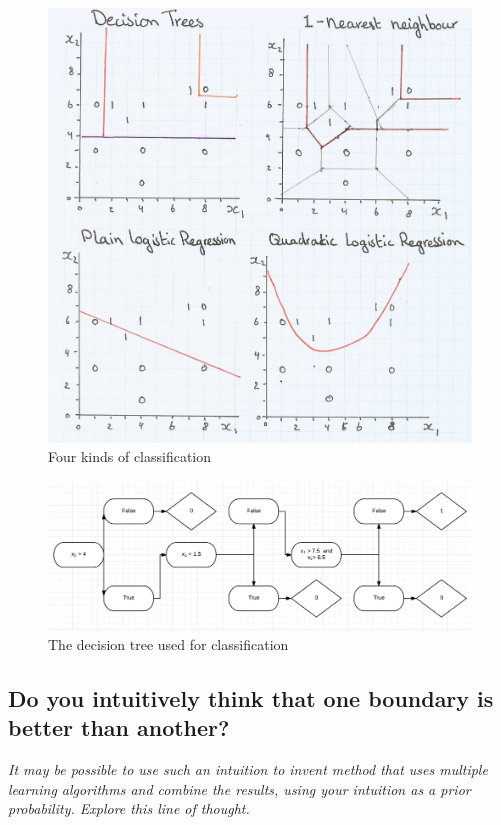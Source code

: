 \documentclass{article}
\begin{document}
\begin{figure} 
	\includegraphics[width=\linewidth]{classification.JPG}
	\caption{Four kinds of classification}
	\label{fig:classification}
\end{figure}


\begin{figure}
	\includegraphics[width=\linewidth]{decisiontree.jpg}
	\caption{The decision tree used for classification}
	\label{fig:decistree}
\end{figure}

\subsection{Do you intuitively think that one boundary is better than another?}
\textit{It may be possible to use such an intuition to invent method that uses
multiple learning algorithms and combine the results, using your intuition as a prior
probability. Explore this line of thought.}
\end{document}
